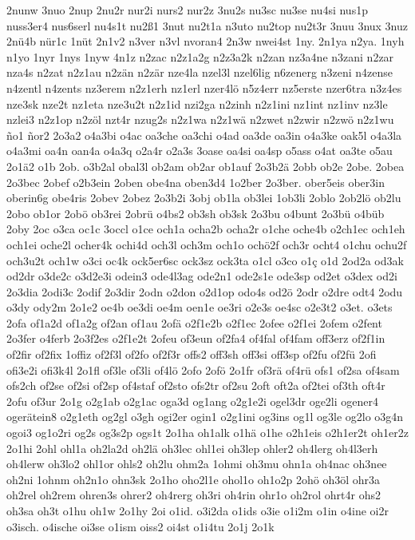 {2nunw
3nuo
2nup
2nu2r
nur2i
nurs2
nur2z
3nu2s
nu3sc
nu3se
nu4si
nus1p
nuss3er4
nus6serl
nu4s1t
nu2ß1
3nut
nu2t1a
n3uto
nu2top
nu2t3r
3nuu
3nux
3nuz
2nü4b
nür1c
1nüt
2n1v2
n3ver
n3vl
nvoran4
2n3w
nwei4st
1ny.
2n1ya
n2ya.
1nyh
n1yo
1nyr
1nys
1nyw
4n1z
n2zac
n2z1a2g
n2z3a2k
n2zan
nz3a4ne
n3zani
n2zar
nza4s
n2zat
n2z1au
n2zän
n2zär
nze4la
nzel3l
nzel6lig
n6zenerg
n3zeni
n4zense
n4zentl
n4zents
nz3erem
n2z1erh
nz1erl
nzer4lö
n5z4err
nz5erste
nzer6tra
n3z4es
nze3sk
nze2t
nz1eta
nze3u2t
n2z1id
nzi2ga
n2zinh
n2z1ini
nz1int
nz1inv
nz3le
nzlei3
n2z1op
n2zöl
nzt4r
nzug2s
n2z1wa
n2z1wä
n2zwet
n2zwir
n2zwö
n2z1wu
ño1
ñor2
2o3a2
o4a3bi
o4ac
oa3che
oa3chi
o4ad
oa3de
oa3in
o4a3ke
oak5l
o4a3la
o4a3mi
oa4n
oan4a
o4a3q
o2a4r
o2a3s
3oase
oa4si
oa4sp
o5ass
o4at
oa3te
o5au
2o1ä2
o1b
2ob.
o3b2al
obal3l
ob2am
ob2ar
ob1auf
2o3b2ä
2obb
ob2e
2obe.
2obea
2o3bec
2obef
o2b3ein
2oben
obe4na
oben3d4
1o2ber
2o3ber.
ober5eis
ober3in
oberin6g
obe4ris
2obev
2obez
2o3b2i
3obj
ob1la
ob3lei
1ob3li
2oblo
2ob2lö
ob2lu
2obo
ob1or
2obö
ob3rei
2obrü
o4bs2
ob3sh
ob3sk
2o3bu
o4bunt
2o3bü
o4büb
2oby
2oc
o3ca
oc1c
3occl
o1ce
och1a
ocha2b
ocha2r
o1che
oche4b
o2ch1ec
och1eh
och1ei
oche2l
ocher4k
ochi4d
och3l
och3m
och1o
ochö2f
och3r
ocht4
o1chu
ochu2f
och3u2t
och1w
o3ci
oc4k
ock5er6sc
ock3sz
ock3ta
o1cl
o3co
o1ç
o1d
2od2a
od3ak
od2dr
o3de2c
o3d2e3i
odein3
ode4l3ag
ode2n1
ode2s1e
ode3sp
od2et
o3dex
od2i
2o3dia
2odi3c
2odif
2o3dir
2odn
o2don
o2d1op
odo4s
od2ö
2odr
o2dre
odt4
2odu
o3dy
ody2m
2o1e2
oe4b
oe3di
oe4m
oen1e
oe3ri
o2e3s
oe4sc
o2e3t2
o3et.
o3ets
2ofa
of1a2d
of1a2g
of2an
of1au
2ofä
o2f1e2b
o2f1ec
2ofee
o2f1ei
2ofem
o2fent
2o3fer
o4ferb
2o3f2es
o2f1e2t
2ofeu
of3eun
of2fa4
of4fal
of4fam
off3erz
of2f1in
of2fir
of2fix
1offiz
of2f3l
of2fo
of2f3r
offs2
off3sh
off3si
off3sp
of2fu
of2fü
2ofi
ofi3e2i
ofi3k4l
2o1fl
of3le
of3li
of4lö
2ofo
2ofö
2o1fr
of3rä
of4rü
ofs1
of2sa
of4sam
ofs2ch
of2se
of2si
of2sp
of4staf
of2sto
ofs2tr
of2su
2oft
oft2a
of2tei
of3th
oft4r
2ofu
of3ur
2o1g
o2g1ab
o2g1ac
oga3d
og1ang
o2g1e2i
ogel3dr
oge2li
ogener4
ogerätein8
o2g1eth
og2gl
o3gh
ogi2er
ogin1
o2g1ini
og3ins
og1l
og3le
og2lo
o3g4n
ogoi3
og1o2ri
og2s
og3s2p
ogs1t
2o1ha
oh1alk
o1hä
o1he
o2h1eis
o2h1er2t
oh1er2z
2o1hi
2ohl
ohl1a
oh2la2d
oh2lä
oh3lec
ohl1ei
oh3lep
ohler2
oh4lerg
oh4l3erh
oh4lerw
oh3lo2
ohl1or
ohls2
oh2lu
ohm2a
1ohmi
oh3mu
ohn1a
oh4nac
oh3nee
oh2ni
1ohnm
oh2n1o
ohn3sk
2o1ho
oho2l1e
ohol1o
oh1o2p
2ohö
oh3öl
ohr3a
oh2rel
oh2rem
ohren3s
ohrer2
oh4rerg
oh3ri
oh4rin
ohr1o
oh2rol
ohrt4r
ohs2
oh3sa
oh3t
o1hu
oh1w
2o1hy
2oi
o1id.
o3i2da
o1ids
o3ie
o1i2m
o1in
o4ine
oi2r
o3isch.
o4ische
oi3se
o1ism
oiss2
oi4st
o1i4tu
2o1j
2o1k
}
